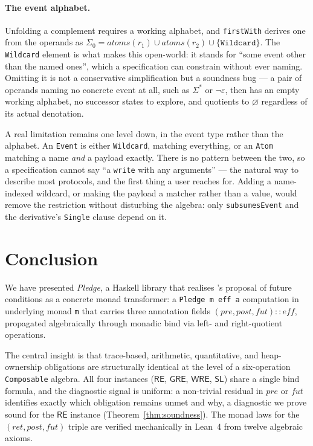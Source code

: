 \documentclass[acmsmall,screen]{acmart}
\newcommand{\RE}{\mathsf{RE}}
\newcommand{\GRE}{\mathsf{GRE}}
\newcommand{\WRE}{\mathsf{WRE}}
\newcommand{\SL}{\mathsf{SL}}
\newcommand{\pre}{\mathit{pre}}
\newcommand{\post}{\mathit{post}}
\newcommand{\fut}{\mathit{fut}}
\newcommand{\ret}{\mathit{ret}}
\begin{document}
\paragraph{The event alphabet.}
Unfolding a complement requires a working alphabet, and
\lstinline{firstWith} derives one from the operands as
$\Sigma_0 = \mathit{atoms}(r_1) \cup \mathit{atoms}(r_2) \cup
\{\mathtt{Wildcard}\}$.
The \lstinline{Wildcard} element is what makes this open-world: it stands
for ``some event other than the named ones'', which a specification can
constrain without ever naming.
Omitting it is not a conservative simplification but a soundness bug --- a
pair of operands naming no concrete event at all, such as $\Sigma^*$ or
$\neg \varepsilon$, then has an empty working alphabet, no successor states
to explore, and quotients to $\varnothing$ regardless of its actual
denotation.

A real limitation remains one level down, in the event type rather than the
alphabet.
An \lstinline{Event} is either \lstinline{Wildcard}, matching everything, or
an \lstinline{Atom} matching a name \emph{and} a payload exactly.
There is no pattern between the two, so a specification cannot say ``a
\lstinline{write} with any arguments'' --- the natural way to describe most
protocols, and the first thing a user reaches for.
Adding a name-indexed wildcard, or making the payload a matcher rather than
a value, would remove the restriction without disturbing the algebra: only
\lstinline{subsumesEvent} and the derivative's \lstinline{Single} clause
depend on it.

\section{Conclusion}
\label{sec:conclusion}

We have presented \emph{Pledge}, a Haskell library that realises
\citet{song2025futurecond}'s proposal of future conditions as a concrete
monad transformer: a \lstinline{Pledge m eff a} computation in underlying
monad \lstinline{m} that carries three annotation fields
$(\pre, \post, \fut) :: \mathit{eff}$, propagated algebraically through monadic
bind via left- and right-quotient operations.

The central insight is that trace-based, arithmetic, quantitative, and
heap-ownership obligations are structurally identical at the level of a
six-operation \lstinline{Composable} algebra.
All four instances ($\RE$, $\GRE$, $\WRE$, $\SL$) share a single bind
formula, and the diagnostic signal is uniform: a non-trivial residual in
$\pre$ or $\fut$ identifies exactly which obligation remains unmet and why,
a diagnostic we prove sound for the $\RE$ instance
(Theorem~\ref{thm:soundness}).
The monad laws for the $(\ret, \post, \fut)$ triple are verified
mechanically in Lean~4 from twelve algebraic axioms.
\end{document}
